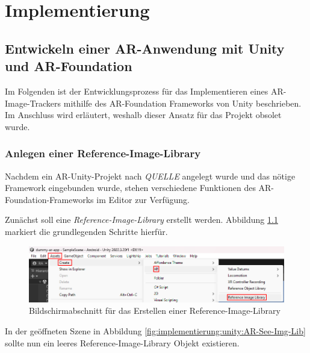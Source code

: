 \chapter{Implementierung} \label{cha:implementierung}

\section{Entwickeln einer AR-Anwendung mit Unity und AR-Foundation}

Im Folgenden ist der Entwicklungsprozess für das Implementieren eines AR-Image-Trackers mithilfe des AR-Foundation Frameworks von Unity beschrieben. Im Anschluss wird erläutert, weshalb dieser Ansatz für das Projekt obsolet wurde.

\subsection{Anlegen einer Reference-Image-Library}


Nachdem ein AR-Unity-Projekt nach \textit{QUELLE} angelegt wurde und das nötige Framework eingebunden wurde, stehen verschiedene Funktionen des AR-Foundation-Frameworks im Editor zur Verfügung.

Zunächst soll eine \textit{Reference-Image-Library} erstellt werden. Abbildung \ref{fig:implementierung:unity:AR-Create-Img-Lib} markiert die grundlegenden Schritte hierfür.

\begin{figure}[H]
    \centering
    \includegraphics[width=\textwidth]{images/PrAr_UnityAR-Create-Img-Lib.png}
    \caption{Bildschirmabschnitt für das Erstellen einer Reference-Image-Library}
    \label{fig:implementierung:unity:AR-Create-Img-Lib}
\end{figure}

In der geöffneten Szene in Abbildung \ref{fig:implementierung:unity:AR-See-Img-Lib} sollte nun ein leeres Reference-Image-Library Objekt existieren.

